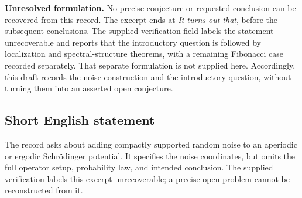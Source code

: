 \documentclass[11pt]{article}
\begin{document}
\textbf{Unresolved formulation.} No precise conjecture or requested conclusion can be recovered from this record. The excerpt ends at \emph{It turns out that}, before the subsequent conclusions. The supplied verification field labels the statement unrecoverable and reports that the introductory question is followed by localization and spectral-structure theorems, with a remaining Fibonacci case recorded separately. That separate formulation is not supplied here. Accordingly, this draft records the noise construction and the introductory question, without turning them into an asserted open conjecture.
\subsection{Short English statement}
The record asks about adding compactly supported random noise to an aperiodic or ergodic Schr\"odinger potential. It specifies the noise coordinates, but omits the full operator setup, probability law, and intended conclusion. The supplied verification labels this excerpt unrecoverable; a precise open problem cannot be reconstructed from it.
\end{document}
